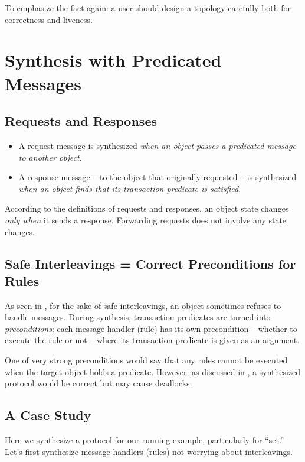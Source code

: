 \documentclass[format=manuscript]{acmart}
\begin{document}
To emphasize the fact again: a user should design a topology carefully both for
correctness and liveness.

\section{Synthesis with Predicated Messages}

\subsection{Requests and Responses}

\begin{itemize}
\item A request message is synthesized \emph{when an object passes a predicated
  message to another object}.
\item A response message -- to the object that originally requested -- is
  synthesized \emph{when an object finds that its transaction predicate is
    satisfied}.
\end{itemize}

According to the definitions of requests and responses, an object state changes
\emph{only when} it sends a response. Forwarding requests does not involve any
state changes.

\subsection{Safe Interleavings = Correct Preconditions for Rules}

As seen in , for the sake of safe interleavings, an object
sometimes refuses to handle messages. During synthesis, transaction predicates
are turned into \emph{preconditions}: each message handler (rule) has its own
precondition -- whether to execute the rule or not -- where its transaction
predicate is given as an argument.

One of very strong preconditions would say that any rules cannot be executed
when the target object holds a predicate. However, as discussed in
, a synthesized protocol would be correct but may cause
deadlocks.

\subsection{A Case Study}

Here we synthesize a protocol for our running example, particularly for ``set.''
Let's first synthesize message handlers (rules) not worrying about
interleavings.
\end{document}
